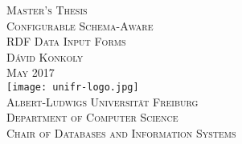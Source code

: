 \begin{titlepage}
\begin{center}
	\vspace{6em}
	{\Large \textsc{Master's Thesis}}\\
	\vspace{5em}
	{\huge \textsc{Configurable Schema-Aware}}\\
	\vspace{1em}
	{\huge \textsc{RDF Data Input Forms}}\\
	\vspace{4em}
	{\Large \textsc{Dávid Konkoly}}\\
	\vspace{3em}
	{\Large \textsc{May 2017}}\\
	\vspace{4em}
	\texttt{[image: unifr-logo.jpg]}\\
	\vspace{4em}
	{\Large \textsc{Albert-Ludwigs Universität Freiburg}}\\
	\vspace{1em}
	{\Large \textsc{Department of Computer Science}}\\
	\vspace{1em}
	{\Large \textsc{Chair of Databases and Information Systems}}\\
\end{center}
\end{titlepage}